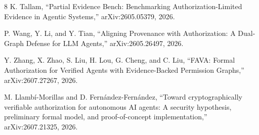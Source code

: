 \documentclass[11pt]{article}
\begin{document}
\begin{thebibliography}{8}
K. Tallam, ``Partial Evidence Bench: Benchmarking Authorization-Limited Evidence in Agentic Systems,'' arXiv:2605.05379, 2026.

P. Wang, Y. Li, and Y. Tian, ``Aligning Provenance with Authorization: A Dual-Graph Defense for LLM Agents,'' arXiv:2605.26497, 2026.

Y. Zhang, X. Zhao, S. Liu, H. Lou, G. Cheng, and C. Liu, ``FAVA: Formal Authorization for Verified Agents with Evidence-Backed Permission Graphs,'' arXiv:2607.27267, 2026.

M. Llamb\'i-Morillas and D. Fern\'andez-Fern\'andez, ``Toward cryptographically verifiable authorization for autonomous AI agents: A security hypothesis, preliminary formal model, and proof-of-concept implementation,'' arXiv:2607.21325, 2026.
\end{thebibliography}
\end{document}
